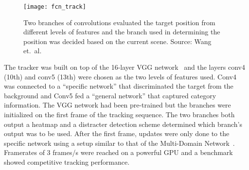 \begin{figure}[H]
\centering
\texttt{[image: fcn\_track]}
\caption{Two branches of convolutions evaluated the target position from different levels of features and the branch used in determining the position was decided based on the current scene. Source: Wang et.~al.~\cite{FCN_TRACK_2}}\label{fig:fcn}
\end{figure}

The tracker was built on top of the 16-layer VGG network~\cite{VGG} and the layers conv4 (10th) and conv5 (13th) were chosen as the two levels of features used. Conv4 was connected to a ``specific network'' that discriminated the target from the background and Conv5 fed a ``general network'' that captured category information. The VGG network had been pre-trained but the branches were initialized on the first frame of the tracking sequence. The two branches both output a heatmap and a distracter detection scheme determined which branch's output was to be used. After the first frame, updates were only done to the specific network using a setup similar to that of the Multi-Domain Network~\cite{MDNET}. Framerates of 3 frames/s were reached on a powerful GPU and a benchmark showed competitive tracking performance.~\cite{FCN_TRACK_2}
